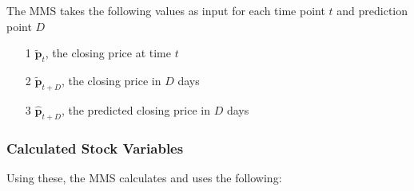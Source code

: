 \documentclass[a4paper,11pt,oneside]{article}
\theoremstyle{plain}
\theoremstyle{definition}
\begin{document}
The MMS takes the following values as input for each time point $t$  and prediction point $D$
\begin{itemize}
	\item [1] {$\mathbf{\tilde{p}}_t$}, the closing price at time $t$
	\item [2] $\mathbf{\tilde{p}}_{t+D}$, the closing price in $D$ days
	\item [3] $\hat{\mathbf{p}}_{t+D}$, the predicted closing price in $D$ days
\end{itemize}

\subsubsection{Calculated Stock Variables}

Using these, the MMS calculates and uses the following:
\end{document}
